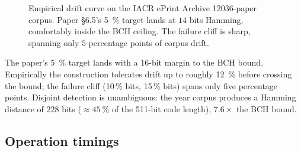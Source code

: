 \documentclass[11pt,a4paper]{article}
\begin{document}
\begin{figure}[h]
  \centering
  \caption{Empirical drift curve on the IACR ePrint Archive
    \num{12036}\nobreakdash-paper corpus.  Paper §6.5's
    \SI{5}{\percent} target lands at $14$ bits Hamming, comfortably
    inside the BCH ceiling.  The failure cliff is sharp, spanning
    only $5$ percentage points of corpus drift.}
  \label{fig:repro:drift}
\end{figure}

The paper's \SI{5}{\percent} target lands with a 16\nobreakdash-bit
margin to the BCH bound.  Empirically the construction tolerates
drift up to roughly \SI{12}{\percent} before crossing the bound; the
failure cliff (10\,\%  bits, 15\,\%  bits) spans only five percentage points.  Disjoint detection is
unambiguous: the year corpus produces a Hamming
distance of $228$ bits ($\approx \SI{45}{\percent}$ of the
\num{511}\nobreakdash-bit code length), $7.6\!\times$ the BCH bound.

\subsection{Operation timings}
\label{sec:repro:timings}
\end{document}
